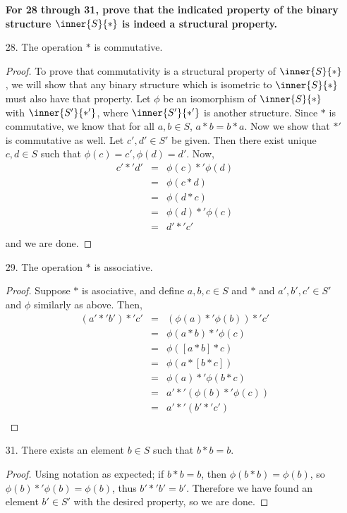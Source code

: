 \documentclass[letterpaper]{article}
\begin{document}
\begin{enumerate}
\hspace*{-0.74cm}
\textbf{For 28 through 31, prove that the indicated property of the binary structure $\inner{S}{*}$ is indeed a structural property.}

\item[28.] The operation $*$ is commutative. 
\begin{proof}
To prove that commutativity is a structural property of $\inner{S}{*}$, we will show that any binary structure which is isometric to $\inner{S}{*}$ must also have that property. Let $\phi$ be an isomorphism of $\inner{S}{*}$ with $\inner{S'}{*'}$, where $\inner{S'}{*'}$ is another structure. Since $*$ is commutative, we know that for all $a,b\in S$, $a*b=b*a$. Now we show that $*'$ is commutative as well. Let $c', d'\in S'$ be given. Then there exist unique $c,d\in S$ such that $\phi(c)=c', \phi(d)=d'$. Now, 
\[\begin{array}{rcl}
c'*'d'&=&\phi(c)*'\phi(d)\\
&=&\phi(c*d)\\
&=&\phi(d*c)\\
&=&\phi(d)*'\phi(c)\\
&=&d'*'c'\\
\end{array}\]
and we are done.
\end{proof}

\pagebreak
\item[29.] The operation $*$ is associative. 
\begin{proof}
Suppose $*$ is asociative, and define $a,b,c\in S$ and $*$ and $a',b',c'\in S'$ and $\phi$ similarly as above. Then, 
\[\begin{array}{rcl}
(a'*'b')*'c'&=&(\phi(a)*'\phi(b))*'c'\\
&=&\phi(a*b)*'\phi(c)\\
&=&\phi([a*b]*c)\\
&=&\phi(a*[b*c])\\
&=&\phi(a)*'\phi(b*c)\\
&=&a'*'(\phi(b)*'\phi(c))\\
&=&a'*'(b'*'c')\\
\end{array}\]
\end{proof}

\item[31.] There exists an element $b\in S$ such that $b*b=b$. 

\begin{proof}
Using notation as expected; if $b*b=b$, then $\phi(b*b)=\phi(b)$, so $\phi(b)*'\phi(b)=\phi(b)$, thus $b'*'b'=b'$. Therefore we have found an element $b'\in S'$ with the desired property, so we are done. 
\end{proof}


\end{enumerate}
\end{document}
